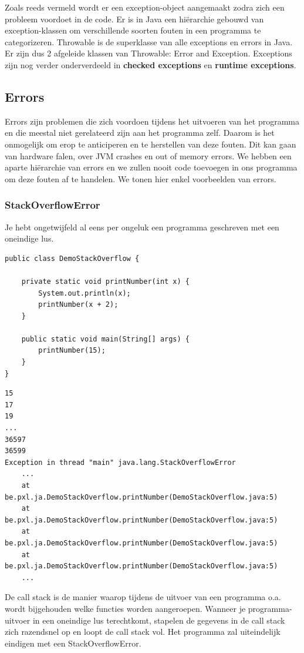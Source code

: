 \documentclass{tstextbook}
\begin{document}
Zoals reeds vermeld wordt er een exception-object aangemaakt zodra zich een probleem voordoet in de code. 
Er is in Java een hi\"erarchie gebouwd van exception-klassen om verschillende soorten fouten in een programma te categorizeren. Throwable is de superklasse van alle exceptions en errors in Java. Er zijn dus 2 afgeleide klassen van Throwable: Error and Exception. Exceptions zijn nog verder onderverdeeld in \textbf{checked exceptions} en \textbf{runtime exceptions}.

\subsection{Errors}

Errors zijn problemen die zich voordoen tijdens het uitvoeren van het programma en die meestal niet gerelateerd zijn aan het programma zelf. Daarom is het onmogelijk om erop te anticiperen en te herstellen van deze fouten. Dit kan gaan van hardware falen, over JVM crashes en out of memory errors. We hebben een aparte hi\"erarchie van errors en we zullen nooit code toevoegen in ons programma om deze fouten af te handelen. We tonen hier enkel voorbeelden van errors.


\subsubsection{StackOverflowError}
Je hebt ongetwijfeld al eens per ongeluk een programma geschreven met een oneindige lus. 

\begin{lstlisting}
public class DemoStackOverflow {

	private static void printNumber(int x) {
		System.out.println(x);
		printNumber(x + 2);
	}

	public static void main(String[] args) {
		printNumber(15);
	}
}
\end{lstlisting}

\begin{verbatim}
15
17
19
...
36597
36599
Exception in thread "main" java.lang.StackOverflowError
	...
	at be.pxl.ja.DemoStackOverflow.printNumber(DemoStackOverflow.java:5)
	at be.pxl.ja.DemoStackOverflow.printNumber(DemoStackOverflow.java:5) 
	at be.pxl.ja.DemoStackOverflow.printNumber(DemoStackOverflow.java:5) 
	at be.pxl.ja.DemoStackOverflow.printNumber(DemoStackOverflow.java:5) 
	...
\end{verbatim}

De call stack is de manier waarop tijdens de uitvoer van een programma o.a. wordt bijgehouden welke functies worden aangeroepen. Wanneer je programma-uitvoer in een oneindige lus terechtkomt, stapelen de gegevens in de call stack zich razendsnel op en loopt de call stack vol. Het programma zal uiteindelijk eindigen met een StackOverflowError.
\end{document}
